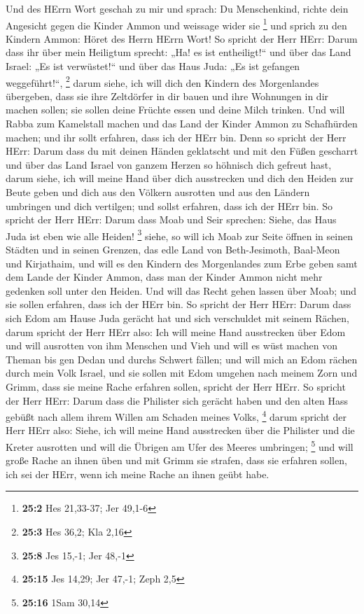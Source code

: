  Und des HErrn Wort geschah zu mir und sprach:
 Du Menschenkind, richte dein Angesicht gegen die Kinder
Ammon und weissage wider sie \footnote{\textbf{25:2} Hes 21,33-37; Jer
  49,1-6}  und sprich zu den Kindern Ammon: Höret des
Herrn HErrn Wort! So spricht der Herr HErr: Darum dass ihr über mein
Heiligtum sprecht: „Ha! es ist entheiligt!{}`` und über das Land Israel:
„Es ist verwüstet!{}`` und über das Haus Juda: „Es ist gefangen
weggeführt!{}``, \footnote{\textbf{25:3} Hes 36,2; Kla 2,16}
 darum siehe, ich will dich den Kindern des Morgenlandes
übergeben, dass sie ihre Zeltdörfer in dir bauen und ihre Wohnungen in
dir machen sollen; sie sollen deine Früchte essen und deine Milch
trinken.  Und will Rabba zum Kamelstall machen und das
Land der Kinder Ammon zu Schafhürden machen; und ihr sollt erfahren,
dass ich der HErr bin.  Denn so spricht der Herr HErr:
Darum dass du mit deinen Händen geklatscht und mit den Füßen gescharrt
und über das Land Israel von ganzem Herzen so höhnisch dich gefreut
hast,  darum siehe, ich will meine Hand über dich
ausstrecken und dich den Heiden zur Beute geben und dich aus den Völkern
ausrotten und aus den Ländern umbringen und dich vertilgen; und sollst
erfahren, dass ich der HErr bin.  So spricht der Herr
HErr: Darum dass Moab und Seir sprechen: Siehe, das Haus Juda ist eben
wie alle Heiden! \footnote{\textbf{25:8} Jes 15,-1; Jer 48,-1}
 siehe, so will ich Moab zur Seite öffnen in seinen
Städten und in seinen Grenzen, das edle Land von Beth-Jesimoth,
Baal-Meon und Kirjathaim,  und will es den Kindern des
Morgenlandes zum Erbe geben samt dem Lande der Kinder Ammon, dass man
der Kinder Ammon nicht mehr gedenken soll unter den Heiden.
 Und will das Recht gehen lassen über Moab; und sie
sollen erfahren, dass ich der HErr bin.  So spricht der
Herr HErr: Darum dass sich Edom am Hause Juda gerächt hat und sich
verschuldet mit seinem Rächen,  darum spricht der Herr
HErr also: Ich will meine Hand ausstrecken über Edom und will ausrotten
von ihm Menschen und Vieh und will es wüst machen von Theman bis gen
Dedan und durchs Schwert fällen;  und will mich an Edom
rächen durch mein Volk Israel, und sie sollen mit Edom umgehen nach
meinem Zorn und Grimm, dass sie meine Rache erfahren sollen, spricht der
Herr HErr.  So spricht der Herr HErr: Darum dass die
Philister sich gerächt haben und den alten Hass gebüßt nach allem ihrem
Willen am Schaden meines Volks, \footnote{\textbf{25:15} Jes 14,29; Jer
  47,-1; Zeph 2,5}  darum spricht der Herr HErr also:
Siehe, ich will meine Hand ausstrecken über die Philister und die Kreter
ausrotten und will die Übrigen am Ufer des Meeres umbringen; \footnote{\textbf{25:16}
  1Sam 30,14}  und will große Rache an ihnen üben und mit
Grimm sie strafen, dass sie erfahren sollen, ich sei der HErr, wenn ich
meine Rache an ihnen geübt habe.

